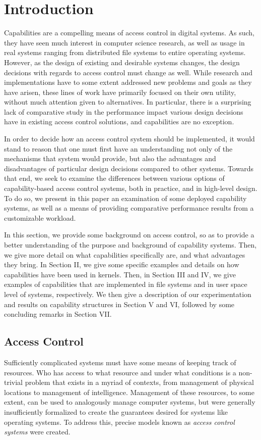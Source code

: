 \section{Introduction}
\label{sec:Introduction}
Capabilities are a compelling means of access control in digital systems. As such, they have seen much interest in computer science research, as well as usage in real systems ranging from distributed file systems to entire operating systems. However, as the design of existing and desirable systems changes, the design decisions with regards to access control must change as well. While research and implementations have to some extent addressed new problems and goals as they have arisen, these lines of work have primarily focused on their own utility, without much attention given to alternatives. In particular, there is a surprising lack of comparative study in the performance impact various design decisions have in existing access control solutions, and capabilities are no exception.

In order to decide how an access control system should be implemented, it would stand to reason that one must first have an understanding not only of the mechanisms that system would provide, but also the advantages and disadvantages of particular design decisions compared to other systems. Towards that end, we seek to examine the differences between various options of capability-based access control systems, both in practice, and in high-level design. To do so, we present in this paper an examination of some deployed capability systems, as well as a means of providing comparative performance results from a customizable workload.

In this section, we provide some background on access control, so as to provide a better understanding of the purpose and background of capability systems. Then, we give more detail on what capabilities specifically are, and what advantages they bring. In Section II, we give some specific examples and details on how capabilities have been used in kernels. Then, in Section III and IV, we give examples of capabilities that are implemented in file systems and in user space level of systems, respectively. We then give a description of our experimentation and results on capability structures in Section V and VI, followed by some concluding remarks in Section VII.

\subsection{Access Control}
Sufficiently complicated systems must have some means of keeping track of resources. Who has access to what resource and under what conditions is a non-trivial problem that exists in a myriad of contexts, from management of physical locations to management of intelligence. Management of these resources, to some extent, can be used to analogously manage computer systems, but were generally insufficiently formalized to create the guarantees desired for systems like operating systems. To address this, precise models known as {\em access control systems} were created.

